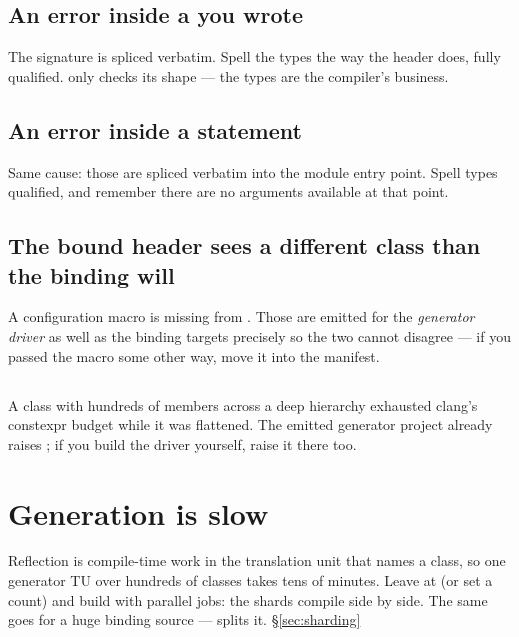 \subsection*{An error inside a  you wrote}

The signature is spliced verbatim. Spell the types the way the header does,
fully qualified.  only checks its shape --- the types are the
compiler's business.

\subsection*{An error inside a  statement}

Same cause: those are spliced verbatim into the module entry point. Spell types
qualified, and remember there are no arguments available at that point.

\subsection*{The bound header sees a different class than the binding will}

A configuration macro is missing from . Those are
emitted for the \emph{generator driver} as well as the binding targets precisely
so the two cannot disagree --- if you passed the macro some other way, move it
into the manifest.

\subsection*{}

A class with hundreds of members across a deep hierarchy exhausted clang's
constexpr budget while it was flattened. The emitted generator project already
raises ; if you build the driver yourself, raise it
there too.

\section{Generation is slow}

Reflection is compile-time work in the translation unit that names a class, so
one generator TU over hundreds of classes takes tens of minutes. Leave
 at  (or set a count) and build with
parallel jobs: the shards compile side by side. The same goes for a huge
binding source ---  splits it. \S\ref{sec:sharding}

